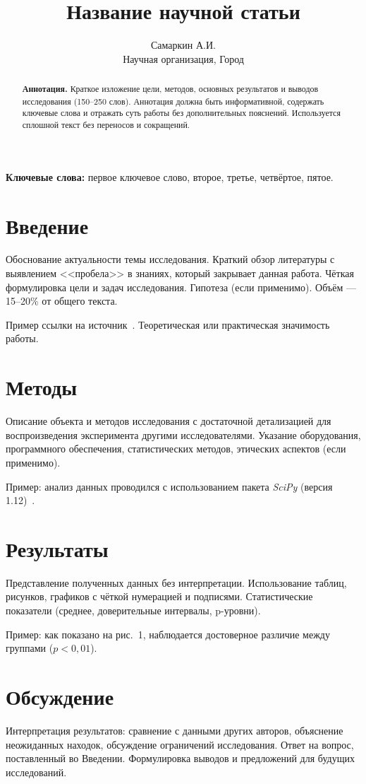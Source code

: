 \documentclass[12pt]{article}
\title{Название научной статьи}
\author{Самаркин А.И.\\
        \small Научная организация, Город}
\date{}
\begin{document}
\maketitle

\begin{abstract}
\noindent\textbf{Аннотация.} Краткое изложение цели, методов, основных результатов и выводов исследования (150–250 слов). Аннотация должна быть информативной, содержать ключевые слова и отражать суть работы без дополнительных пояснений. Используется сплошной текст без переносов и сокращений.
\end{abstract}

\noindent\textbf{Ключевые слова:} первое ключевое слово, второе, третье, четвёртое, пятое.

\section*{Введение}
Обоснование актуальности темы исследования. Краткий обзор литературы с выявлением <<пробела>> в знаниях, который закрывает данная работа. Чёткая формулировка цели и задач исследования. Гипотеза (если применимо). Объём — 15–20\% от общего текста.

Пример ссылки на источник~\cite{ivanov2020}. Теоретическая или практическая значимость работы.

\section*{Методы}
Описание объекта и методов исследования с достаточной детализацией для воспроизведения эксперимента другими исследователями. Указание оборудования, программного обеспечения, статистических методов, этических аспектов (если применимо).

Пример: анализ данных проводился с использованием пакета \textit{SciPy} (версия 1.12)~\cite{scipy2020}.

\section*{Результаты}
Представление полученных данных без интерпретации. Использование таблиц, рисунков, графиков с чёткой нумерацией и подписями. Статистические показатели (среднее, доверительные интервалы, p-уровни).

Пример: как показано на рис.~1, наблюдается достоверное различие между группами ($p < 0{,}01$).

\section*{Обсуждение}
Интерпретация результатов: сравнение с данными других авторов, объяснение неожиданных находок, обсуждение ограничений исследования. Ответ на вопрос, поставленный во Введении. Формулировка выводов и предложений для будущих исследований.
\end{document}
